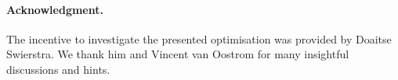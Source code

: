 \documentclass[submission,copyright,creativecommons]{eptcs}
\renewcommand\;{\,}
\begin{document}
\paragraph{Acknowledgment.}
The incentive to investigate the presented optimisation was provided by
  Doaitse Swierstra. We thank him and Vincent van Oostrom for many insightful
  discussions and hints.



\end{document}
